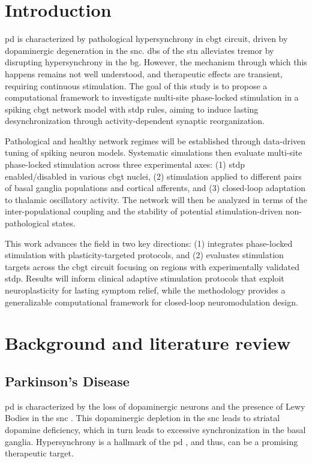 \newpage
{}
\setcounter{page}{1}

\section{Introduction}
\acrfull{pd} is characterized by pathological hypersynchrony in \acrfull{cbgt} circuit, driven by
dopaminergic degeneration in the \acrfull{snc}.
\acrlong{dbs} of the \acrfull{stn} alleviates tremor by disrupting
hypersynchrony in the \acrfull{bg}.
However, the mechanism through which this happens remains not well understood, and therapeutic effects are transient,
requiring continuous stimulation.
The goal of this study is to propose a computational framework to investigate multi-site phase-locked stimulation in a
spiking \acrshort{cbgt} network model with \acrfull{stdp} rules, aiming to induce lasting desynchronization
through activity-dependent synaptic reorganization.

Pathological and healthy network regimes will be established through data-driven tuning of spiking
neuron models.
Systematic simulations then evaluate multi-site phase-locked stimulation across three experimental axes:
(1) \acrshort{stdp} enabled/disabled in various \acrshort{cbgt} nuclei,
(2) stimulation applied to different pairs of basal ganglia populations and cortical afferents, and
(3) closed-loop adaptation to thalamic oscillatory activity.
The network will then be analyzed in terms of the inter-populational coupling and the stability of potential
stimulation-driven non-pathological states.

This work advances the field in two key directions:
(1) integrates phase-locked stimulation with plasticity-targeted protocols, and
(2) evaluates stimulation targets across the \acrshort{cbgt} circuit focusing on regions with experimentally validated \acrshort{stdp}.
Results will inform clinical adaptive stimulation protocols that exploit neuroplasticity for lasting symptom relief,
while the methodology provides a generalizable computational framework for closed-loop neuromodulation design.

\section{Background and literature review}

\subsection{Parkinson's Disease}
\acrshort{pd} is characterized by the loss of dopaminergic neurons and the presence of
Lewy Bodies in the \acrshort{snc} \cite{del2018advances}. This dopaminergic depletion in the \acrshort{snc} leads to striatal dopamine
deficiency, which in turn leads to excessive synchronization in the basal ganglia.
Hypersynchrony is a hallmark of the \acrshort{pd} \cite{hammond2007pathological, helmich2012cerebral},
and thus, can be a promising therapeutic target.


